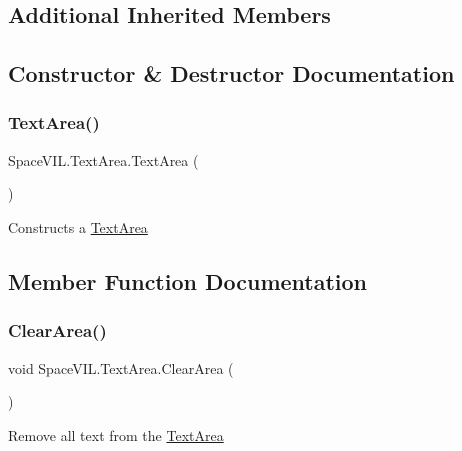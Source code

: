 \subsection*{Additional Inherited Members}


\subsection{Constructor \& Destructor Documentation}
\mbox{\label{class_space_v_i_l_1_1_text_area_a1450947f3404821d0242263470641c75}} 
\subsubsection{\texorpdfstring{Text\+Area()}{TextArea()}}
{\footnotesize\ttfamily Space\+V\+I\+L.\+Text\+Area.\+Text\+Area (\begin{DoxyParamCaption}{ }\end{DoxyParamCaption})}



Constructs a \mbox{\hyperlink{class_space_v_i_l_1_1_text_area}{Text\+Area}} 



\subsection{Member Function Documentation}
\mbox{\label{class_space_v_i_l_1_1_text_area_a698e7fe3b617f824c8e10a11c81a9a51}} 
\subsubsection{\texorpdfstring{Clear\+Area()}{ClearArea()}}
{\footnotesize\ttfamily void Space\+V\+I\+L.\+Text\+Area.\+Clear\+Area (\begin{DoxyParamCaption}{ }\end{DoxyParamCaption})}



Remove all text from the \mbox{\hyperlink{class_space_v_i_l_1_1_text_area}{Text\+Area}} 

